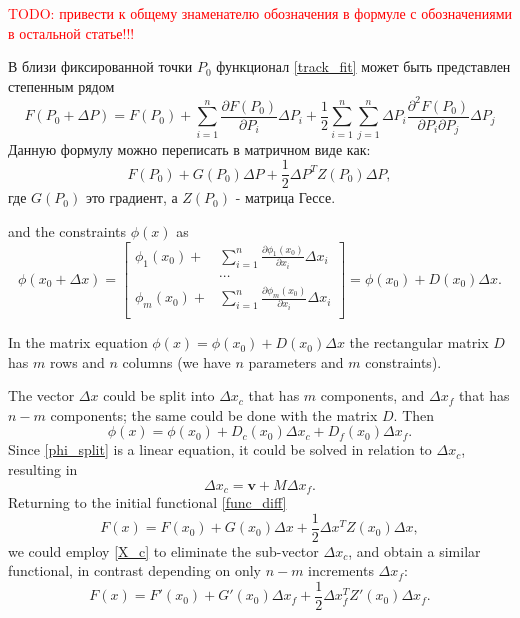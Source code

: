 \textcolor{red}{TODO: привести к общему знаменателю обозначения в формуле с обозначениями в остальной статье!!!}

В близи фиксированной точки $P_0$ функционал \eqref{track_fit} может быть представлен степенным рядом
\begin{equation}\label{func_diff}
F(P_0+\Delta P) = F(P_0) + \sum_{i=1}^n \frac{\partial F(P_0)}{\partial P_i} \Delta P_i + \frac{1}{2}\sum_{i=1}^n\sum_{j=1}^n \Delta P_i \frac{\partial^2 F(P_0)}{\partial P_i \partial P_j} \Delta P_j
\end{equation}
Данную формулу можно переписать в матричном виде как:
\begin{equation}
 \label{eq_diff1}
F(P_0) + G(P_0) \Delta P + \frac{1}{2}\Delta P^T Z(P_0) \Delta P,
\end{equation}
где $G(P_0)$ это градиент, а $Z(P_0)$ - матрица Гессе.

and the constraints $\phi(x)$ as
\begin{equation}\label{constr_diff}
\phi(x_0+\Delta x) =
\left[
\begin{aligned}
\phi_1(x_0) +& \sum_{i=1}^n \frac{\partial \phi_1(x_0)}{\partial x_i}\Delta x_i\\
&\cdots\\
\phi_m(x_0) +& \sum_{i=1}^n \frac{\partial \phi_m(x_0)}{\partial x_i}\Delta x_i\\
\end{aligned}
\right]
= \phi(x_0) + D(x_0) \Delta x.
\end{equation}

In the matrix equation $\phi(x) = \phi(x_0) + D(x_0) \Delta x$ the rectangular matrix $D$ has $m$ rows and $n$ columns (we have $n$ parameters and $m$ constraints).

The vector $\Delta x$ could be split into $\Delta x_c$ that has $m$ components, and $\Delta x_f$ that has $n-m$ components; the same could be done with the matrix $D$. Then
\begin{equation}\label{phi_split}
\phi(x) = \phi(x_0) + D_c(x_0) \Delta x_c + D_f(x_0) \Delta x_f.
\end{equation}
Since \eqref{phi_split} is a linear equation, it could be solved in relation to $\Delta x_c$, resulting in
\begin{equation}\label{X_c}
\Delta x_c = \mathbf{v} + M \Delta x_f.
\end{equation}
Returning to the initial functional \eqref{func_diff}
\[F(x) = F(x_0) + G(x_0) \Delta x + \frac{1}{2}\Delta x^T Z(x_0) \Delta x,\]
we could employ \eqref{X_c} to eliminate the sub-vector $\Delta x_c$, and obtain a similar functional, in contrast depending on only $n-m$ increments $\Delta x_f$:
\begin{equation}\label{func_fin}
F(x) = F'(x_0) + G'(x_0) \Delta x_f + \frac{1}{2}\Delta x_f^T Z'(x_0) \Delta x_f.
\end{equation}
